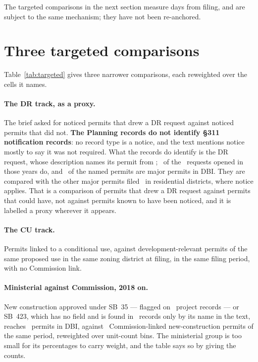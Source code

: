 \documentclass[11pt]{article}
\begin{document}
The targeted comparisons in the next section measure days from filing, and are subject to the
same mechanism; they have not been re-anchored.

\section{Three targeted comparisons}

Table~\ref{tab:targeted} gives three narrower comparisons, each reweighted over the cells it
names.

\paragraph{The DR track, as a proxy.} The brief asked for noticed permits that drew a DR request
against noticed permits that did not. \textbf{The Planning records do not identify \S311
notification records}: no record type is a notice, and the text mentions notice mostly to say
it was not required. What the records do identify is the DR request, whose description names
its permit from \pcDrpYears; \pcDrpNamed\ of the \pcDrpN\ requests opened in those years do,
and \pcDrNamedInDbi\ of the named permits are major permits in DBI. They are compared with the
other major permits filed \pcDrFiled\ in residential districts, where notice applies. That is a
comparison of permits that drew a DR request against permits that could have, not against
permits known to have been noticed, and it is labelled a proxy wherever it appears.

\paragraph{The CU track.} Permits linked to a conditional use, against development-relevant
permits of the same proposed use in the same zoning district at filing, in the same filing
period, with no Commission link.

\paragraph{Ministerial against Commission, 2018 on.} New construction approved under SB~35 ---
flagged on \pcSbThirtyFive\ project records --- or SB~423, which has no field and is found in
\pcSbFourTwoThree\ records only by its name in the text, reaches \pcMinisterialPermits\ permits
in DBI, against \pcMinCommissionPermits\ Commission-linked new-construction permits of the same
period, reweighted over unit-count bins. The ministerial group is too small for its percentages
to carry weight, and the table says so by giving the counts.
\end{document}
